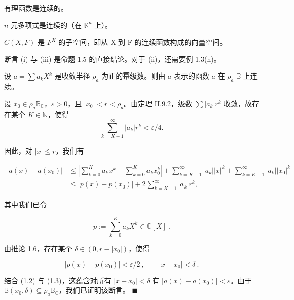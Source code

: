 \begin{corollary}

\begin{subitems}
\item

有理函数是连续的。

\item

$n$ 元多项式是连续的（在 $\mathbb{K}^{n}$ 上）。

\item

$ C(X,F) $ 是 $ F^X $ 的子空间，即从 X 到 F 的连续函数构成的向量空间。

\proofhead
断言 (i) 与 (iii) 是命题 1.5 的直接结论。对于 (ii)，还需要例 1.3(h)。
\end{subitems}

\end{corollary}

\begin{proposition}

设 $ a = \sum a_k X^k $ 是收敛半径 $ \rho_a $ 为正的幂级数。则由 $ a $ 表示的函数 $ \underline{a} $ 在 $ \rho_a $ $ \mathbb{B} $ 上连续。

\proofhead
设 $ x_0 \in \rho_a \mathbb{B}_{\mathbb{C}} $，$ \varepsilon > 0 $，且 $ |x_0| < r < \rho_a $。由定理 II.9.2，级数 $ \sum |a_k| r^k $ 收敛，故存在某个 $ K \in \mathbb{N} $，使得
\begin{equation}
\sum_{k=K+1}^{\infty}\left|a_{k}\right|r^{k}<\varepsilon/4.
\end{equation}

因此，对 $ |x| \leq r $，我们有

\begin{equation}
\begin{aligned}
|\underline{a}(x)-\underline{a}(x_{0})|&\leq\left|\sum_{k=0}^{K}a_{k} x^{k}-\sum_{k=0}^{K}a_{k} x_{0}^{k}\right|+\sum_{k=K+1}^{\infty}|a_{k}|\left|x\right|^{k}+\sum_{k=K+1}^{\infty}|a_{k}|\left|x_{0}\right|^{k}\\&\leq|p(x)-p(x_{0})|+2\sum_{k=K+1}^{\infty}|a_{k}|r^{k},
\end{aligned}
\end{equation}

其中我们已令

\[
p:=\sum_{k=0}^{K}a_{k}X^{k}\in\mathbb{C}[X]~.
\]

由推论 1.6，存在某个 $ \delta \in (0, r - |x_0|) $，使得

\[
|p(x)-p(x_{0})|<\varepsilon/2~,\qquad|x-x_{0}|<\delta~.
\]

结合 (1.2) 与 (1.3)，这蕴含对所有 $ |x - x_0| < \delta $ 有 $ |\underline{a}(x) - \underline{a}(x_0)| < \varepsilon $。由于 $ \mathbb{B}(x_0, \delta) \subseteq \rho_a \mathbb{B}_{\mathbb{C}} $，我们已证明该断言。 $ \blacksquare $

\end{proposition}

